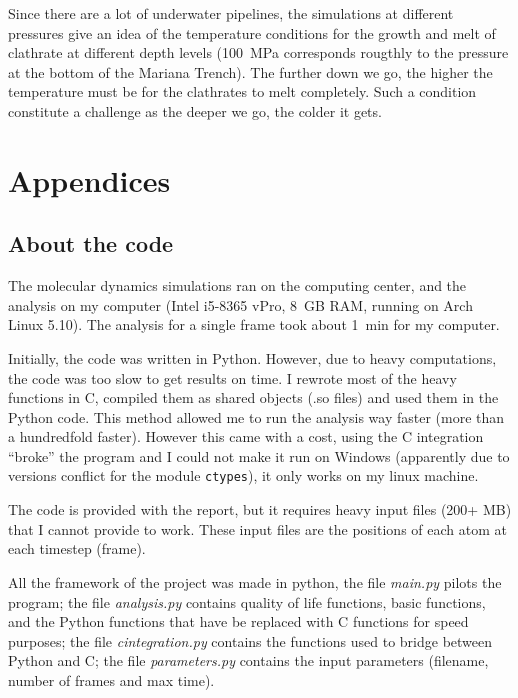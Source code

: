 Since there are a lot of underwater pipelines, the simulations at different pressures give an idea of the temperature conditions for the growth and melt of clathrate at different depth levels (\SI{100}{\mega\pascal} corresponds rougthly to the pressure at the bottom of the Mariana Trench). The further down we go, the higher the temperature must be for the clathrates to melt completely. Such a condition constitute a challenge as the deeper we go, the colder it gets.

\nocite{*}
\begin{multicols}{2}
    [\center{\printbibheading}]
    \printbibliography[heading=none]
\end{multicols}

\newpage
\section{Appendices}
\subsection{About the code}
The molecular dynamics simulations ran on the computing center, and the analysis on my computer (Intel i5-8365 vPro, \SI{8}{\giga B} RAM, running on Arch Linux 5.10). The analysis for a single frame took about \SI{1}{\minute} for my computer.

Initially, the code was written in Python. However, due to heavy computations, the code was too slow to get results on time. I rewrote most of the heavy functions in C, compiled them as shared objects (.so files) and used them in the Python code. This method allowed me to run the analysis way faster (more than a hundredfold faster). However this came with a cost, using the C integration ``broke'' the program and I could not make it run on Windows (apparently due to versions conflict for the module \texttt{ctypes}), it only works on my linux machine.

The code is provided with the report, but it requires heavy input files (200+ \si{\mega B}) that I cannot provide to work. These input files are the positions of each atom at each timestep (frame).

All the framework of the project was made in python, the file \textit{main.py} pilots the program; the file \textit{analysis.py} contains quality of life functions, basic functions, and the Python functions that have be replaced with C functions for speed purposes; the file \textit{cintegration.py} contains the functions used to bridge between Python and C; the file \textit{parameters.py} contains the input parameters (filename, number of frames and max time).

